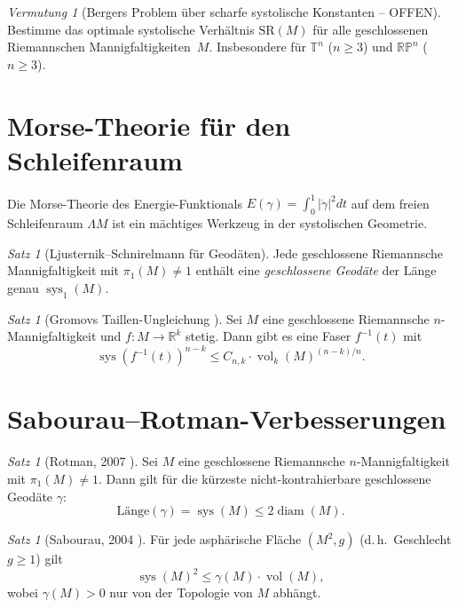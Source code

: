 \documentclass[12pt,a4paper]{amsart}
\theoremstyle{definition}
\theoremstyle{remark}
\newtheorem{satz}[theorem]{Satz}
\newtheorem{vermutung}[theorem]{Vermutung}
\DeclareMathOperator{\sys}{sys}
\DeclareMathOperator{\vol}{vol}
\DeclareMathOperator{\diam}{diam}
\newcommand{\RR}{\mathbb{R}}
\newcommand{\RP}{\mathbb{RP}}
\newcommand{\TT}{\mathbb{T}}
\begin{document}
\begin{vermutung}[Bergers Problem über scharfe systolische Konstanten -- OFFEN]
Bestimme das optimale systolische Verhältnis $\mathrm{SR}(M)$ für alle
geschlossenen Riemannschen Mannigfaltigkeiten~$M$.  Insbesondere für
$\TT^n$ ($n \ge 3$) und $\RP^n$ ($n \ge 3$).
\end{vermutung}

\section{Morse-Theorie für den Schleifenraum}

Die Morse-Theorie des Energie-Funktionals
$E(\gamma) = \int_0^1 |\dot\gamma|^2 dt$ auf dem freien Schleifenraum
$\Lambda M$ ist ein mächtiges Werkzeug in der systolischen Geometrie.

\begin{satz}[Ljusternik--Schnirelmann für Geodäten]
Jede geschlossene Riemannsche Mannigfaltigkeit mit $\pi_1(M) \neq 1$
enthält eine \emph{geschlossene Geodäte} der Länge genau $\sys_1(M)$.
\end{satz}

\begin{satz}[Gromovs Taillen-Ungleichung \cite{Gromov2003waist}]
Sei $M$ eine geschlossene Riemannsche $n$-Mannigfaltigkeit und
$f \colon M \to \RR^k$ stetig.  Dann gibt es eine Faser $f^{-1}(t)$ mit
\[
  \sys(f^{-1}(t))^{n-k} \le C_{n,k} \cdot \vol_k(M)^{(n-k)/n}.
\]
\end{satz}

\section{Sabourau--Rotman-Verbesserungen}

\begin{satz}[Rotman, 2007 \cite{Rotman2007}]
Sei $M$ eine geschlossene Riemannsche $n$-Mannigfaltigkeit mit $\pi_1(M) \neq 1$.
Dann gilt für die kürzeste nicht-kontrahierbare geschlossene Geodäte $\gamma$:
\[
  \mathrm{Länge}(\gamma) = \sys(M) \le 2 \diam(M).
\]
\end{satz}

\begin{satz}[Sabourau, 2004 \cite{Sabourau2004}]
Für jede asphärische Fläche $(M^2, g)$ (d.\,h.\ Geschlecht $g \ge 1$) gilt
\[
  \sys(M)^2 \le \gamma(M) \cdot \vol(M),
\]
wobei $\gamma(M) > 0$ nur von der Topologie von $M$ abhängt.
\end{satz}
\end{document}
